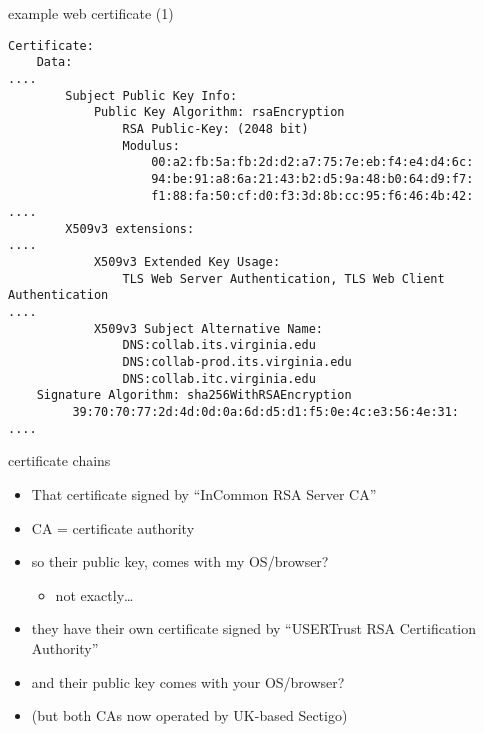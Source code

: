 \begin{frame}[fragile]{example web certificate (1)}
\begin{Verbatim}[fontsize=\scriptsize]
Certificate:
    Data:
....
        Subject Public Key Info:
            Public Key Algorithm: rsaEncryption
                RSA Public-Key: (2048 bit)
                Modulus:
                    00:a2:fb:5a:fb:2d:d2:a7:75:7e:eb:f4:e4:d4:6c:
                    94:be:91:a8:6a:21:43:b2:d5:9a:48:b0:64:d9:f7:
                    f1:88:fa:50:cf:d0:f3:3d:8b:cc:95:f6:46:4b:42:
....
        X509v3 extensions:
....
            X509v3 Extended Key Usage: 
                TLS Web Server Authentication, TLS Web Client Authentication
....
            X509v3 Subject Alternative Name: 
                DNS:collab.its.virginia.edu
                DNS:collab-prod.its.virginia.edu
                DNS:collab.itc.virginia.edu
    Signature Algorithm: sha256WithRSAEncryption
         39:70:70:77:2d:4d:0d:0a:6d:d5:d1:f5:0e:4c:e3:56:4e:31:
....
\end{Verbatim}
\end{frame}

\begin{frame}{certificate chains}
    \begin{itemize}
    \item That certificate signed by ``InCommon RSA Server CA''
    \item CA = certificate authority
    \vspace{.5cm}
    \item so their public key, comes with my OS/browser?
        \begin{itemize}
        \item not exactly\ldots
        \end{itemize}
    \item they have their own certificate signed by ``USERTrust RSA Certification Authority''
    \item and their public key comes with your OS/browser?
    \vspace{.5cm}
    \item (but both CAs now operated by UK-based Sectigo)
    \end{itemize}
\end{frame}
